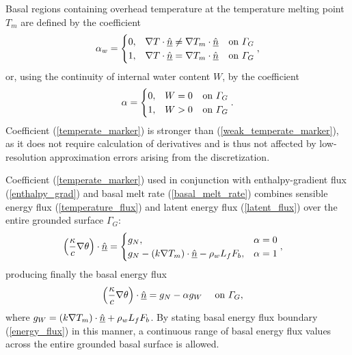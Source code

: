 Basal regions containing overhead temperature at the temperature melting point $T_m$ are defined by the coefficient
\begin{align}
  \label{weak_temperate_marker}
  \alpha_w = \begin{cases}
             0, & \nabla T \cdot \normal \neq \nabla T_m \cdot \normal \hspace{2.5mm} \text{ on } \Gamma_G \\
             1, & \nabla T \cdot \normal = \nabla T_m \cdot \normal \hspace{2.5mm} \text{ on } \Gamma_G 
           \end{cases},
\end{align}
or, using the continuity of internal water content $W$, by the coefficient
\begin{align}
  \label{temperate_marker}
  \alpha = \begin{cases}
             0, & W = 0 \hspace{2.5mm} \text{ on } \Gamma_G \\
             1, & W > 0 \hspace{2.5mm} \text{ on } \Gamma_G 
           \end{cases}.
\end{align}
Coefficient (\ref{temperate_marker}) is stronger than (\ref{weak_temperate_marker}), as it does not require calculation of derivatives and is thus not affected by low-resolution approximation errors arising from the discretization.

Coefficient (\ref{temperate_marker}) used in conjunction with enthalpy-gradient flux (\ref{enthalpy_grad}) and basal melt rate (\ref{basal_melt_rate}) combines sensible energy flux (\ref{temperature_flux}) and latent energy flux (\ref{latent_flux}) over the entire grounded surface $\Gamma_G$:
\begin{align}
  \label{temperate_flux}
  \left( \frac{\kappa}{c} \nabla \theta \right) \cdot \normal &= \begin{cases}
             g_N, & \alpha = 0  \\
             g_N - (k \nabla T_m) \cdot \normal - \rho_w L_f F_b, & \alpha = 1
           \end{cases},
\end{align}
producing finally the basal energy flux
\begin{align}
  \label{energy_flux}
  \left( \frac{\kappa}{c} \nabla \theta \right) \cdot \normal
  &= g_N - \alpha g_W &&\text{ on } \Gamma_G,
\end{align}
where $g_W = (k \nabla T_m) \cdot \underline{\hat{n}} + \rho_w L_f F_b$.  By stating basal energy flux boundary (\ref{energy_flux}) in this manner, a continuous range of basal energy flux values across the entire grounded basal surface is allowed.

